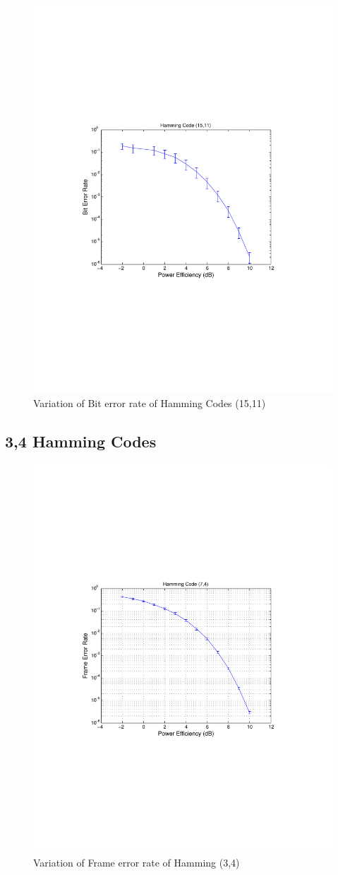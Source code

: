 \documentclass[11pt, english]{article}
\begin{document}
\begin{figure}[H]
    \centering
    \includegraphics[width=.8\textwidth]{hamming_15_11_incomplete_run_ber.pdf}
    \caption{Variation of Bit error rate of Hamming Codes (15,11)}
    \label{ham_15_11_ber}
\end{figure}


\subsection{3,4 Hamming Codes}

\begin{figure}[H]
    \centering
    \includegraphics[width=.8\textwidth]{fer_hamming_3_4.pdf}
    \caption{Variation of Frame error rate of Hamming (3,4)}
    \label{f31}
\end{figure}
\end{document}
